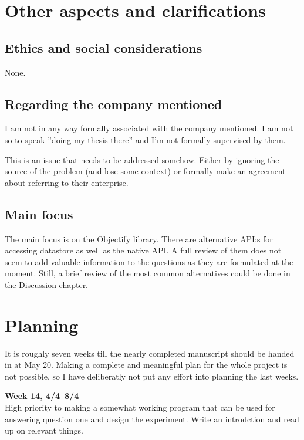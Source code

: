 \documentclass[10pt, titlepage, oneside, a4paper]{article}
\begin{document}
\section*{Other aspects and clarifications}

\subsection*{Ethics and social considerations}

None.

\subsection*{Regarding the company mentioned}

I am not in any way formally associated with the company mentioned. I
am not so to speak ''doing my thesis there'' and I'm not formally
supervised by them.

This is an issue that needs to be addressed somehow. Either by ignoring
the source of the problem (and lose some context) or formally make
an agreement about referring to their enterprise. 

\subsection*{Main focus}

The main focus is on the Objectify library. There are alternative
API:s for accessing datastore as well as the native API. A full review
of them does not seem to add valuable information to the questions as
they are formulated at the moment. Still, a brief review of the most
common alternatives could be done in the Discussion chapter.

\newpage

\section*{Planning}

It is roughly seven weeks till the nearly completed manuscript should
be handed in at May 20. Making a complete and meaningful plan for the
whole project is not possible, so I have deliberatly not put any
effort into planning the last weeks.

\textbf{Week 14, 4/4--8/4}\\
High priority to making a somewhat working program that can be used
for answering question one and design the experiment. Write an introdction and read up on relevant things.
\end{document}
